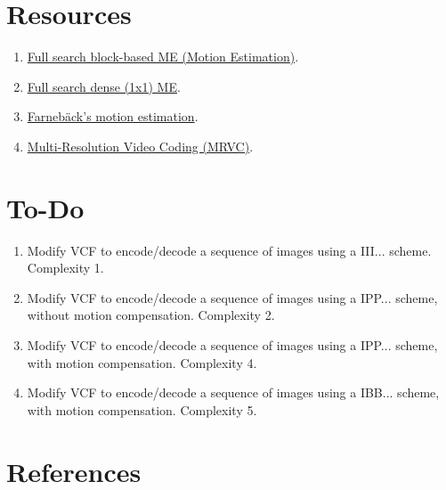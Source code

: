 \section{Resources}
\begin{enumerate}
\item \href{https://github.com/vicente-gonzalez-ruiz/motion_estimation/blob/main/src/motion_estimation/full_search_block_ME.ipynb}{Full search block-based ME (Motion Estimation)}.
\item \href{https://github.com/vicente-gonzalez-ruiz/motion_estimation/blob/main/src/motion_estimation/full_search_dense_ME.ipynb}{Full search dense (1x1) ME}.
\item \href{https://github.com/vicente-gonzalez-ruiz/motion_estimation/blob/main/src/motion_estimation/farneback_ME.ipynb}{Farnebäck's motion estimation}.
\item \href{https://github.com/Sistemas-Multimedia/MRVC}{Multi-Resolution Video Coding (MRVC)}.
\end{enumerate}

\section{To-Do}

\begin{enumerate}
\item Modify VCF to encode/decode a sequence of images using a
  III... scheme. Complexity 1.
\item Modify VCF to encode/decode a sequence of images using a
  IPP... scheme, without motion compensation. Complexity 2.
\item Modify VCF to encode/decode a sequence of images using a
  IPP... scheme, with motion compensation. Complexity 4.
\item Modify VCF to encode/decode a sequence of images using a
  IBB... scheme, with motion compensation. Complexity 5.
\end{enumerate}

  
\section{References}

\renewcommand{\addcontentsline}[3]{}%


